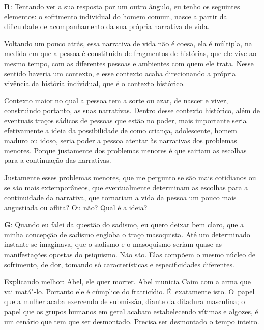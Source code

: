  

\textbf{R}: Tentando ver a sua resposta por um outro ângulo, eu tenho os
seguintes elementos: o sofrimento individual do homem comum, nasce a
partir da dificuldade de acompanhamento da sua própria narrativa de
vida.

 

Voltando um pouco atrás, essa narrativa de vida não é coesa, ela é
múltipla, na medida em que a pessoa é constituída de fragmentos de
histórias, que ele vive ao mesmo tempo, com as diferentes pessoas e
ambientes com quem ele trata. Nesse sentido haveria um contexto, e esse
contexto acaba direcionando a própria vivência da história individual,
que é o contexto histórico.

 

Contexto maior no qual a pessoa tem a sorte ou azar, de nascer e viver,
construindo portanto, as suas narrativas. Dentro desse contexto
histórico, além de eventuais traços sádicos de pessoas que estão no
poder, mais importante seria efetivamente a ideia da possibilidade de
como criança, adolescente, homem maduro ou idoso, seria poder a pessoa
atentar às narrativas dos problemas menores. Porque justamente dos
problemas menores é que sairiam as escolhas para a continuação das
narrativas.

 

Justamente esses problemas menores, que me pergunto se são mais
cotidianos ou se são mais extemporâneos, que eventualmente determinam as
escolhas para a continuidade da narrativa, que tornariam a vida da
pessoa um pouco mais angustiada ou aflita? Ou não? Qual é a ideia?

 

\textbf{G}: Quando eu falei da questão do sadismo, eu quero deixar bem
claro, que a minha concepção de sadismo engloba o traço masoquista. Até
um determinado instante se imaginava, que o sadismo e o masoquismo
seriam quase as manifestações opostas do psiquismo. Não são. Elas
compõem o mesmo núcleo de sofrimento, de dor, tomando só características
e especificidades diferentes.

 

Explicando melhor: Abel, ele quer morrer. Abel municia Caim com a arma
que vai matá"-lo. Portanto ele é cúmplice do fratricídio. É~exatamente
isto. O~papel que a mulher acaba exercendo de submissão, diante da
ditadura masculina; o papel que os grupos humanos em geral acabam
estabelecendo vítimas e algozes, é um cenário que tem que ser
desmontado. Precisa ser desmontado o tempo inteiro.

